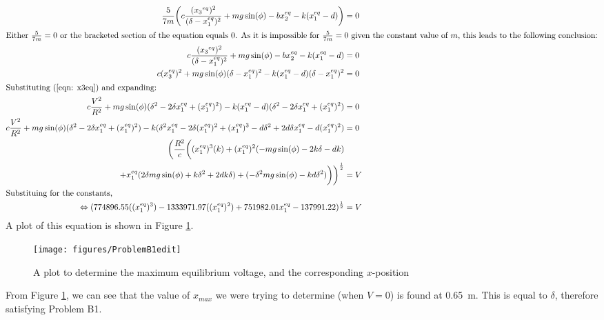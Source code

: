 \documentclass[a4paper,10pt,reqno]{amsart}
\numberwithin{equation}{section}
\begin{document}
\begin{align}
\frac{5}{7m}\bigg(c \frac{({x_3}^{eq})^2}{(\delta - x_1^{eq})^2} + mg\sin(\phi) - bx_2^{eq} - k(x_1^{eq}-d)\bigg) &= 0 \nonumber \\
\intertext{Either $\frac{5}{7m} = 0$ or the bracketed section of the equation equals 0. As it is impossible for $\frac{5}{7m} = 0$ given the constant value of $m$, this leads to the following conclusion:}
c \frac{({x_3}^{eq})^2}{(\delta - x_1^{eq})^2} + mg\sin(\phi) - bx_2^{eq} - k(x_1^{eq}-d) &= 0 \nonumber \\
c(x_3^{eq})^2 + mg\sin(\phi)(\delta - x_1^{eq})^2 - k(x_1^{eq} - d)(\delta - x_1^{eq})^2 &= 0 \nonumber \\
\intertext{Substituting (\ref{eqn: x3eq}) and expanding:}
c\frac{V^2}{R^2} + mg\sin(\phi)(\delta^2 - 2 \delta x_1^{eq} + (x_1^{eq})^2) - k(x_1^{eq} - d)(\delta^2 - 2 \delta x_1^{eq} + (x_1^{eq})^2) &= 0 \nonumber \\
c\frac{V^2}{R^2} + mg\sin(\phi)(\delta^2 - 2 \delta x_1^{eq} + (x_1^{eq})^2) - k(\delta^2 x_1^{eq} - 2\delta (x_1^{eq})^2 + (x_1^{eq})^3 -d\delta^2 + 2d\delta x_1^{eq} - d(x_1^{eq})^2) &= 0 \nonumber \\
\bigg(\frac{R^2}{c}\bigg((x_1^{eq})^3(k) + (x_1^{eq})^2(-mg\sin(\phi) - 2k\delta -dk) \nonumber \\ + x_1^{eq}(2\delta mg\sin(\phi) + k\delta^2 +2dk\delta)   + (-\delta^2mg\sin(\phi) - kd\delta^2)\bigg)\bigg)^\frac{1}{2} &= V \nonumber \\ 
\intertext{Substituing for the constants,}
\Leftrightarrow (774896.55((x_1^{eq})^3) - 1333971.97((x_1^{eq})^2) + 751982.01x_1^{eq} - 137991.22)^{\frac{1}{2}} &= V \label{eqn: B1deriv}
\end{align}
A plot of this equation is shown in Figure \ref{fig:B1plot}.
\begin{figure}[h]
\centering
\texttt{[image: figures/ProblemB1edit]}
\caption{A plot to determine the maximum equilibrium voltage, and the corresponding $x$-position}
\label{fig:B1plot}
\end{figure}
From Figure \ref{fig:B1plot}, we can see that the value of $x_{max}$ we were trying to determine (when $V = 0$) is found at 0.65~m. This is equal to $\delta$, therefore satisfying Problem B1.
\end{document}
